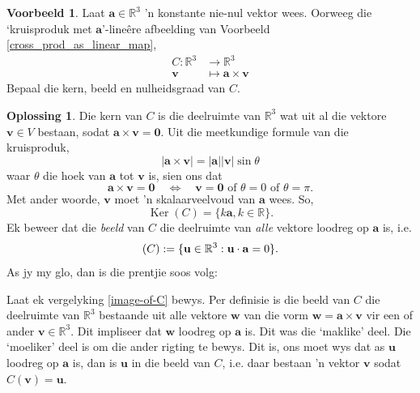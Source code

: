 \documentclass[a4paper,11pt]{book}
\theoremstyle{definition}
\newtheorem{example_environment}{Voorbeeld}[chapter]
\newtheorem*{solution}{Oplossing}
\newcommand{\ve}[1]{\mathbf{#1}}
\newenvironment{example}
	{
		\begin{oframed}
		\begin{example_environment}
	}
	{
		\end{example_environment}
		\end{oframed}
	}
\DeclareMathOperator{\Ker}{Ker}
\let\Im\relax
\DeclareMathOperator{\Im}{Im} %
\begin{document}
\begin{example} \label{cross-product-example} Laat $\ve{a} \in
	\mathbb{R}^3$ 'n konstante nie-nul vektor
	wees. Oorweeg die `kruisproduk met $\ve{a}$'-line{\^e}re afbeelding van
	Voorbeeld \ref{cross_prod_as_linear_map},
	\begin{align*}
		C : \mathbb{R}^3 & \rightarrow \mathbb{R}^3  \\
		\ve{v} &\mapsto \ve{a} \times \ve{v}
	\end{align*}
	Bepaal die kern, beeld en nulheidsgraad van $C$.
	\begin{solution} Die kern van $C$ is die deelruimte van $\mathbb{R}^3$
		wat uit al die vektore $\ve{v} \in V$ bestaan, sodat $\ve{a} \times
		\ve{v} = \ve{0}$. Uit die meetkundige formule van die kruisproduk,
		\[
			|\ve{a} \times \ve{v}| = |\ve{a}| |\ve{v}| \sin \theta
		\]
		waar $\theta$ die hoek van $\ve{a}$ tot $\ve{v}$ is, sien ons dat 
		\[
			\ve{a} \times \ve{v} = \ve{0} \quad \Leftrightarrow \quad
			\mbox{$\ve{v}=\ve{0}$ of $\theta = 0$ of $\theta= \pi$}.
		\]
		Met ander woorde, $\ve{v}$ moet 'n skalaarveelvoud van $\ve{a}$
		wees. So,
		\[
			\Ker(C) = \{ k \ve{a}, k \in \mathbb{R} \}.
		\]  
		Ek beweer dat die \emph{beeld} van $C$ die deelruimte van
		\emph{alle} vektore loodreg op $\ve{a}$ is, i.e.
		\begin{equation} \label{image-of-C} 
			\Im(C) := \{ \ve{u} \in \mathbb{R}^3 : \ve{u} \cdot \ve{a} = 0
			\}.
		\end{equation}
		As jy my glo, dan is die prentjie soos volg:
	\begin{center}
	\end{center}
		Laat ek vergelyking \eqref{image-of-C} bewys. Per definisie is die
		beeld van $C$ die deelruimte van $\mathbb{R}^3$ bestaande uit alle
		vektore $\ve{w}$ van die vorm $\ve{w} = \ve{a} \times \ve{v}$ vir
		een of ander $\ve{v} \in \mathbb{R}^3$. Dit impliseer dat $\ve{w}$
		loodreg op $\ve{a}$ is. Dit was die `maklike' deel. Die `moeliker'
		deel is om die ander rigting te bewys. Dit is, ons moet wys dat as
		$\ve{u}$ loodreg op $\ve{a}$ is, dan is $\ve{u}$ in die beeld van
		$C$, i.e. daar bestaan 'n vektor $\ve{v}$ sodat $C(\ve{v}) =
		\ve{u}$.


\end{solution}
\end{example}
\end{document}
